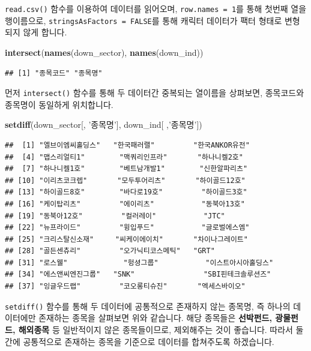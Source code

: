 \documentclass[]{book}
\newenvironment{Shaded}{\begin{snugshade}}{\end{snugshade}}
\newcommand{\KeywordTok}[1]{\textcolor[rgb]{0.13,0.29,0.53}{\textbf{#1}}}
\newcommand{\NormalTok}[1]{#1}
\newcommand{\StringTok}[1]{\textcolor[rgb]{0.31,0.60,0.02}{#1}}
\begin{document}
\texttt{read.csv()} 함수를 이용하여 데이터를 읽어오며, \texttt{row.names\ =\ 1}를 통해 첫번째 열을 행이름으로, \texttt{stringsAsFactors\ =\ FALSE}를 통해 캐릭터 데이터가 팩터 형태로 변형되지 않게 합니다.

\begin{Shaded}
\begin{Highlighting}[]
\KeywordTok{intersect}\NormalTok{(}\KeywordTok{names}\NormalTok{(down_sector), }\KeywordTok{names}\NormalTok{(down_ind))}
\end{Highlighting}
\end{Shaded}

\begin{verbatim}
## [1] "종목코드" "종목명"
\end{verbatim}

먼저 \texttt{intersect()} 함수를 통해 두 데이터간 중복되는 열이름을 상펴보면, 종목코드와 종목명이 동일하게 위치합니다.

\begin{Shaded}
\begin{Highlighting}[]
\KeywordTok{setdiff}\NormalTok{(down_sector[, }\StringTok{'종목명'}\NormalTok{], down_ind[ ,}\StringTok{'종목명'}\NormalTok{])}
\end{Highlighting}
\end{Shaded}

\begin{verbatim}
##  [1] "엘브이엠씨홀딩스"   "한국패러랠"         "한국ANKOR유전"     
##  [4] "맵스리얼티1"        "맥쿼리인프라"       "하나니켈2호"       
##  [7] "하나니켈1호"        "베트남개발1"        "신한알파리츠"      
## [10] "이리츠코크렙"       "모두투어리츠"       "하이골드12호"      
## [13] "하이골드8호"        "바다로19호"         "하이골드3호"       
## [16] "케이탑리츠"         "에이리츠"           "동북아13호"        
## [19] "동북아12호"         "컬러레이"           "JTC"               
## [22] "뉴프라이드"         "윙입푸드"           "글로벌에스엠"      
## [25] "크리스탈신소재"     "씨케이에이치"       "차이나그레이트"    
## [28] "골든센츄리"         "오가닉티코스메틱"   "GRT"               
## [31] "로스웰"             "헝셩그룹"           "이스트아시아홀딩스"
## [34] "에스앤씨엔진그룹"   "SNK"                "SBI핀테크솔루션즈" 
## [37] "잉글우드랩"         "코오롱티슈진"       "엑세스바이오"
\end{verbatim}

\texttt{setdiff()} 함수를 통해 두 데이터에 공통적으로 존재하지 않는 종목명, 즉 하나의 데이터에만 존재하는 종목을 살펴보면 위와 같습니다. 해당 종목들은 \textbf{선박펀드, 광물펀드, 해외종목} 등 일반적이지 않은 종목들이므로, 제외해주는 것이 좋습니다. 따라서 둘간에 공통적으로 존재하는 종목을 기준으로 데이터를 합쳐주도록 하겠습니다.
\end{document}
